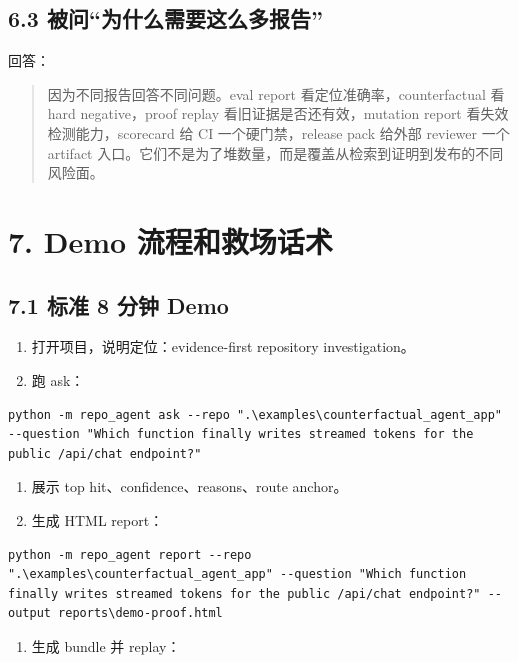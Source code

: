\documentclass[UTF8,12pt,openany]{ctexbook}
\begin{document}
\subsection{6.3 被问“为什么需要这么多报告”}

回答：\par

\begin{quote}
因为不同报告回答不同问题。eval report 看定位准确率，counterfactual 看 hard negative，proof replay 看旧证据是否还有效，mutation report 看失效检测能力，scorecard 给 CI 一个硬门禁，release pack 给外部 reviewer 一个 artifact 入口。它们不是为了堆数量，而是覆盖从检索到证明到发布的不同风险面。
\end{quote}

\section{7. Demo 流程和救场话术}

\subsection{7.1 标准 8 分钟 Demo}

\begin{enumerate}
\item 打开项目，说明定位：evidence-first repository investigation。
\item 跑 ask：
\end{enumerate}

\begin{lstlisting}
python -m repo_agent ask --repo ".\examples\counterfactual_agent_app" --question "Which function finally writes streamed tokens for the public /api/chat endpoint?"
\end{lstlisting}

\begin{enumerate}
\item 展示 top hit、confidence、reasons、route anchor。
\item 生成 HTML report：
\end{enumerate}

\begin{lstlisting}
python -m repo_agent report --repo ".\examples\counterfactual_agent_app" --question "Which function finally writes streamed tokens for the public /api/chat endpoint?" --output reports\demo-proof.html
\end{lstlisting}

\begin{enumerate}
\item 生成 bundle 并 replay：
\end{enumerate}
\end{document}
